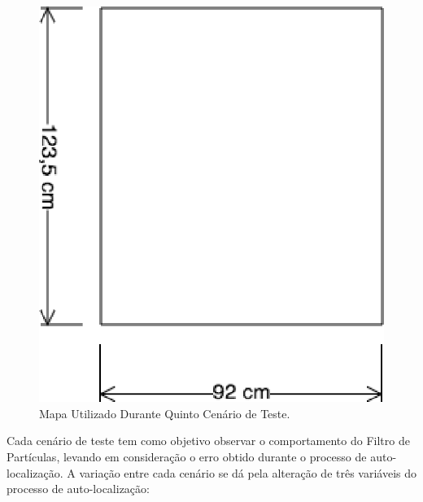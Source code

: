 \begin{figure}[H]
	\centering
	\includegraphics[scale=0.9]{figuras/mapa_quadrado.eps}
	\caption{Mapa Utilizado Durante Quinto Cenário de Teste.}
	\label{img:mapa_quadrado}
\end{figure}

Cada cenário de teste tem como objetivo observar o comportamento do Filtro de Partículas, levando em consideração o erro obtido
durante o processo de auto-localização. A variação entre cada cenário se dá pela alteração de três variáveis do processo de auto-localização:

